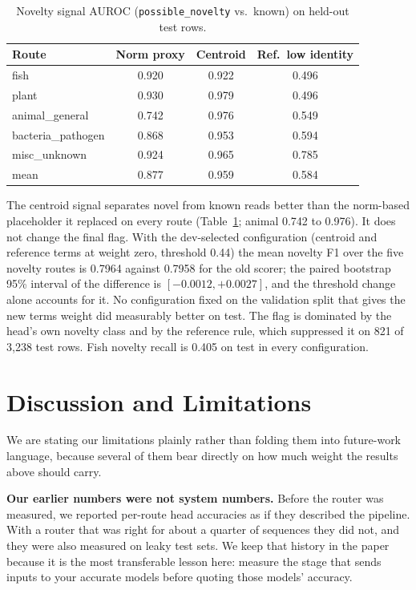\documentclass[conference]{IEEEtran}
\begin{document}
\begin{table}[t]
\centering
\caption{Novelty signal AUROC (\texttt{possible\_novelty} vs.\ known) on held-out test rows.}
\label{tab:novelty}
\begin{tabular}{@{}lccc@{}}
\toprule
Route & Norm proxy & Centroid & Ref.\ low identity \\
\midrule
fish & 0.920 & 0.922 & 0.496 \\
plant & 0.930 & 0.979 & 0.496 \\
animal\_general & 0.742 & 0.976 & 0.549 \\
bacteria\_pathogen & 0.868 & 0.953 & 0.594 \\
misc\_unknown & 0.924 & 0.965 & 0.785 \\
\midrule
mean & 0.877 & 0.959 & 0.584 \\
\bottomrule
\end{tabular}
\end{table}

The centroid signal separates novel from known reads better than the norm-based placeholder it replaced on every route (Table~\ref{tab:novelty}; animal 0.742 to 0.976). It does not change the final flag. With the dev-selected configuration (centroid and reference terms at weight zero, threshold 0.44) the mean novelty F1 over the five novelty routes is 0.7964 against 0.7958 for the old scorer; the paired bootstrap 95\% interval of the difference is $[-0.0012, +0.0027]$, and the threshold change alone accounts for it. No configuration fixed on the validation split that gives the new terms weight did measurably better on test. The flag is dominated by the head's own novelty class and by the reference rule, which suppressed it on 821 of 3{,}238 test rows. Fish novelty recall is 0.405 on test in every configuration.

\section{Discussion and Limitations}

We are stating our limitations plainly rather than folding them into future-work language, because several of them bear directly on how much weight the results above should carry.

\textbf{Our earlier numbers were not system numbers.} Before the router was measured, we reported per-route head accuracies as if they described the pipeline. With a router that was right for about a quarter of sequences they did not, and they were also measured on leaky test sets. We keep that history in the paper because it is the most transferable lesson here: measure the stage that sends inputs to your accurate models before quoting those models' accuracy.
\end{document}

